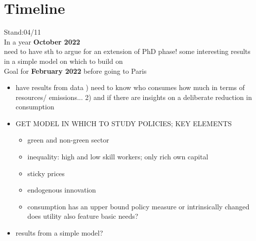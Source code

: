 \section{Timeline}



Stand:04/11 \\
In a year \ar \textbf{October 2022}\\ need to have sth to argue for an extension of PhD phase! 
\ar some interesting results in a simple model on which to build on 
\\

Goal for \textbf{February 2022 }before going to Paris
\begin{itemize}
\item have results from data ) need to know who consumes how much in terms of resources/ emissions... 2) and if there are insights on a deliberate reduction in consumption 
\item GET MODEL IN WHICH TO STUDY POLICIES; KEY ELEMENTS
\begin{itemize}
\item green and non-green sector
\item inequality: high and low skill workers; only rich own capital
\item sticky prices
\item endogenous innovation 
\item consumption has an upper bound \ar policy measure or intrinsically changed\\
does utility also feature basic needs?
\end{itemize}
\item results from a simple model?
\end{itemize}